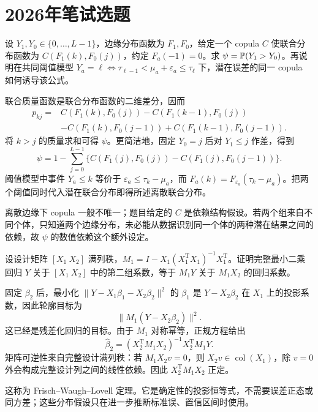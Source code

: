 \section{2026年笔试选题}
\begin{example}[原题1：序数变量的联合分布与优胜概率]\label{yau:2026-1}
设 $Y_1,Y_0\in\{0,\ldots,L-1\}$，边缘分布函数为 $F_1,F_0$，给定一个 copula $C$ 使联合分布函数为 $C(F_1(k),F_0(j))$，约定 $F_a(-1)=0$。求 $\psi=\mathbb P(Y_1>Y_0)$。再说明在共同阈值模型 $Y_a=\ell\Leftrightarrow\tau_{\ell-1}<\mu_a+\varepsilon_a\le\tau_\ell$ 下，潜在误差的同一 copula 如何诱导该公式。
\end{example}
\begin{solve}
联合质量函数是联合分布函数的二维差分，因而
\[
\begin{aligned}
p_{kj}={}&C(F_1(k),F_0(j))-C(F_1(k-1),F_0(j))\\
&-C(F_1(k),F_0(j-1))+C(F_1(k-1),F_0(j-1)).
\end{aligned}
\]
将 $k>j$ 的质量求和可得 $\psi$。更简洁地，固定 $Y_0=j$ 后对 $Y_1\le j$ 作差，得到
\[
\psi=1-\sum_{j=0}^{L-1}\{C(F_1(j),F_0(j))-C(F_1(j),F_0(j-1))\}.
\]
阈值模型中事件 $Y_a\le k$ 等价于 $\varepsilon_a\le\tau_k-\mu_a$，而 $F_a(k)=F_{\varepsilon_a}(\tau_k-\mu_a)$。把两个阈值同时代入潜在联合分布即得所述离散联合分布。

离散边缘下 copula 一般不唯一；题目给定的 $C$ 是依赖结构假设。若两个组来自不同个体，只知道两个边缘分布，未必能从数据识别同一个体的两种潜在结果之间的依赖，故 $\psi$ 的数值依赖这个额外设定。
\end{solve}

\begin{example}[原题2：分块回归与残差化定理]\label{yau:2026-2}
设设计矩阵 $[X_1\ X_2]$ 满列秩，$M_1=I-X_1(X_1^{\mathrm T}X_1)^{-1}X_1^{\mathrm T}$。证明完整最小二乘回归 $Y$ 关于 $[X_1\ X_2]$ 中的第二组系数，等于 $M_1Y$ 关于 $M_1X_2$ 的回归系数。
\end{example}
\begin{solve}
固定 $\beta_2$ 后，最小化 $\|Y-X_1\beta_1-X_2\beta_2\|^2$ 的 $\beta_1$ 是 $Y-X_2\beta_2$ 在 $X_1$ 上的投影系数，因此轮廓目标为
\[
\|M_1(Y-X_2\beta_2)\|^2.
\]
这已经是残差化回归的目标。由于 $M_1$ 对称幂等，正规方程给出
\[
\widehat\beta_2=(X_2^{\mathrm T}M_1X_2)^{-1}X_2^{\mathrm T}M_1Y.
\]
矩阵可逆性来自完整设计满列秩：若 $M_1X_2v=0$，则 $X_2v\in\operatorname{col}(X_1)$，除 $v=0$ 外会构成完整设计列之间的线性依赖。因此 $X_2^{\mathrm T}M_1X_2$ 正定。

这称为 Frisch--Waugh--Lovell 定理。它是确定性的投影恒等式，不需要误差正态或同方差；这些分布假设只在进一步推断标准误、置信区间时使用。
\end{solve}

